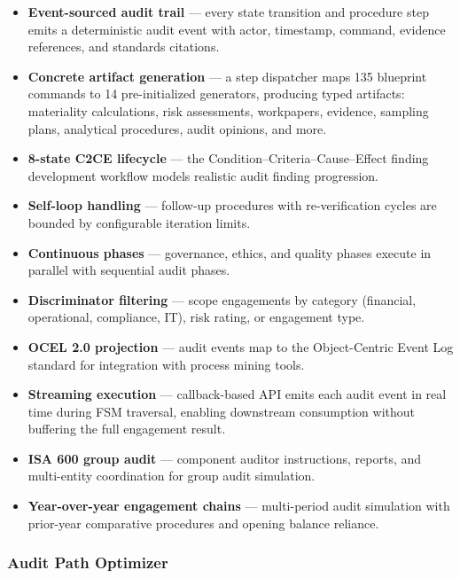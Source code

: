 \documentclass[11pt,a4paper]{article}
\begin{document}
\begin{itemize}[leftmargin=1.2em, itemsep=3pt]
  \item \textbf{Event-sourced audit trail} --- every state transition and
        procedure step emits a deterministic audit event with actor, timestamp,
        command, evidence references, and standards citations.
  \item \textbf{Concrete artifact generation} --- a step dispatcher maps 135
        blueprint commands to 14 pre-initialized generators, producing typed
        artifacts: materiality calculations, risk assessments, workpapers,
        evidence, sampling plans, analytical procedures, audit opinions, and more.
  \item \textbf{8-state C2CE lifecycle} --- the Condition--Criteria--Cause--Effect
        finding development workflow models realistic audit finding progression.
  \item \textbf{Self-loop handling} --- follow-up procedures with re-verification
        cycles are bounded by configurable iteration limits.
  \item \textbf{Continuous phases} --- governance, ethics, and quality phases
        execute in parallel with sequential audit phases.
  \item \textbf{Discriminator filtering} --- scope engagements by category
        (financial, operational, compliance, IT), risk rating, or engagement type.
  \item \textbf{OCEL 2.0 projection} --- audit events map to the Object-Centric
        Event Log standard for integration with process mining tools.
  \item \textbf{Streaming execution} --- callback-based API emits each
        audit event in real time during FSM traversal, enabling downstream
        consumption without buffering the full engagement result.
  \item \textbf{ISA 600 group audit} --- component auditor instructions,
        reports, and multi-entity coordination for group audit simulation.
  \item \textbf{Year-over-year engagement chains} --- multi-period audit
        simulation with prior-year comparative procedures and opening
        balance reliance.
\end{itemize}

\subsubsection{Audit Path Optimizer}
\end{document}

